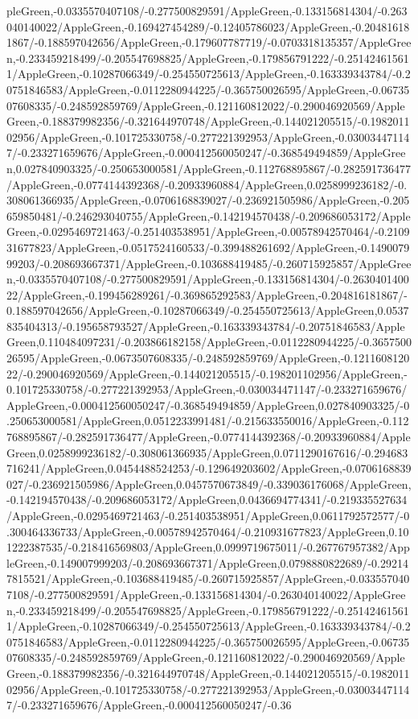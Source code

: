 {\begin{tikzternal}
{pleGreen,-0.0335570407108/-0.277500829591/AppleGreen,-0.133156814304/-0.263040140022/AppleGreen,-0.169427454289/-0.12405786023/AppleGreen,-0.204816181867/-0.188597042656/AppleGreen,-0.179607787719/-0.0703318135357/AppleGreen,-0.233459218499/-0.205547698825/AppleGreen,-0.179856791222/-0.251424615611/AppleGreen,-0.10287066349/-0.254550725613/AppleGreen,-0.163339343784/-0.20751846583/AppleGreen,-0.0112280944225/-0.365750026595/AppleGreen,-0.0673507608335/-0.248592859769/AppleGreen,-0.121160812022/-0.290046920569/AppleGreen,-0.188379982356/-0.321644970748/AppleGreen,-0.144021205515/-0.198201102956/AppleGreen,-0.101725330758/-0.277221392953/AppleGreen,-0.030034471147/-0.233271659676/AppleGreen,-0.000412560050247/-0.368549494859/AppleGreen,0.027840903325/-0.250653000581/AppleGreen,-0.112768895867/-0.282591736477/AppleGreen,-0.0774144392368/-0.20933960884/AppleGreen,0.0258999236182/-0.308061366935/AppleGreen,-0.0706168839027/-0.236921505986/AppleGreen,-0.205659850481/-0.246293040755/AppleGreen,-0.142194570438/-0.209686053172/AppleGreen,-0.0295469721463/-0.251403538951/AppleGreen,-0.00578942570464/-0.210931677823/AppleGreen,-0.0517524160533/-0.399488261692/AppleGreen,-0.149007999203/-0.208693667371/AppleGreen,-0.103688419485/-0.260715925857/AppleGreen,-0.0335570407108/-0.277500829591/AppleGreen,-0.133156814304/-0.263040140022/AppleGreen,-0.199456289261/-0.369865292583/AppleGreen,-0.204816181867/-0.188597042656/AppleGreen,-0.10287066349/-0.254550725613/AppleGreen,0.0537835404313/-0.195658793527/AppleGreen,-0.163339343784/-0.20751846583/AppleGreen,0.110484097231/-0.203866182158/AppleGreen,-0.0112280944225/-0.365750026595/AppleGreen,-0.0673507608335/-0.248592859769/AppleGreen,-0.121160812022/-0.290046920569/AppleGreen,-0.144021205515/-0.198201102956/AppleGreen,-0.101725330758/-0.277221392953/AppleGreen,-0.030034471147/-0.233271659676/AppleGreen,-0.000412560050247/-0.368549494859/AppleGreen,0.027840903325/-0.250653000581/AppleGreen,0.0512233991481/-0.215633550016/AppleGreen,-0.112768895867/-0.282591736477/AppleGreen,-0.0774144392368/-0.20933960884/AppleGreen,0.0258999236182/-0.308061366935/AppleGreen,0.0711290167616/-0.294683716241/AppleGreen,0.0454488524253/-0.129649203602/AppleGreen,-0.0706168839027/-0.236921505986/AppleGreen,0.0457570673849/-0.339036176068/AppleGreen,-0.142194570438/-0.209686053172/AppleGreen,0.0436694774341/-0.219335527634/AppleGreen,-0.0295469721463/-0.251403538951/AppleGreen,0.0611792572577/-0.300464336733/AppleGreen,-0.00578942570464/-0.210931677823/AppleGreen,0.101222387535/-0.218416569803/AppleGreen,0.0999719675011/-0.267767957382/AppleGreen,-0.149007999203/-0.208693667371/AppleGreen,0.0798880822689/-0.292147815521/AppleGreen,-0.103688419485/-0.260715925857/AppleGreen,-0.0335570407108/-0.277500829591/AppleGreen,-0.133156814304/-0.263040140022/AppleGreen,-0.233459218499/-0.205547698825/AppleGreen,-0.179856791222/-0.251424615611/AppleGreen,-0.10287066349/-0.254550725613/AppleGreen,-0.163339343784/-0.20751846583/AppleGreen,-0.0112280944225/-0.365750026595/AppleGreen,-0.0673507608335/-0.248592859769/AppleGreen,-0.121160812022/-0.290046920569/AppleGreen,-0.188379982356/-0.321644970748/AppleGreen,-0.144021205515/-0.198201102956/AppleGreen,-0.101725330758/-0.277221392953/AppleGreen,-0.030034471147/-0.233271659676/AppleGreen,-0.000412560050247/-0.36}
\end{tikzternal}}
